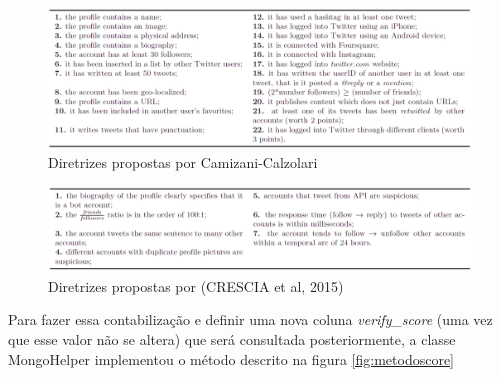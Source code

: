 \begin{figure}[!htb]
\centering
\includegraphics[width=15cm]{img/23.png}
\caption[Caption for LOF]{ Diretrizes propostas por Camizani-Calzolari\footnotemark}
\label{fig:camizani}
\end{figure}



\begin{figure}[!htb]
\centering
\includegraphics[width=15cm]{img/24.png}
\caption[Caption for LOF]{ Diretrizes propostas por (CRESCIA et al, 2015)\footnotemark}
\label{fig:crescia}
\end{figure}


	Para fazer essa contabilização e definir uma nova coluna \textit{verify\_score} (uma vez que esse valor não se altera) que será consultada posteriormente, a classe MongoHelper implementou o método descrito
na figura \ref{fig:metodoscore}
	
